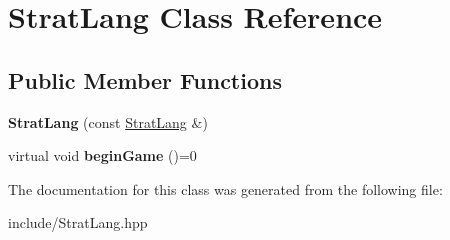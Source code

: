 \hypertarget{classStratLang}{\section{\-Strat\-Lang \-Class \-Reference}
\label{classStratLang}
}
\subsection*{\-Public \-Member \-Functions}
\begin{DoxyCompactItemize}
\item 
\hypertarget{classStratLang_abf94a073c26c844bf2aaa2a49c9873b5}{{\bfseries \-Strat\-Lang} (const \hyperlink{classStratLang}{\-Strat\-Lang} \&)}\label{classStratLang_abf94a073c26c844bf2aaa2a49c9873b5}

\item 
\hypertarget{classStratLang_aa7a231de0ae7c735b16ae06d898e1141}{virtual void {\bfseries begin\-Game} ()=0}\label{classStratLang_aa7a231de0ae7c735b16ae06d898e1141}

\end{DoxyCompactItemize}


\-The documentation for this class was generated from the following file\-:\begin{DoxyCompactItemize}
\item 
include/\-Strat\-Lang.\-hpp\end{DoxyCompactItemize}

